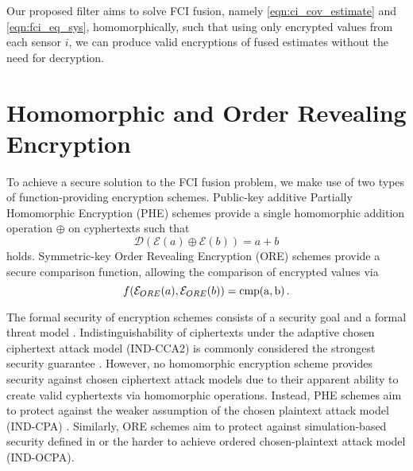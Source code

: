 \documentclass[letterpaper, 10 pt, conference]{ieeeconf}  %
\begin{document}
Our proposed filter aims to solve FCI fusion, namely \eqref{eqn:ci_cov_estimate} and \eqref{eqn:fci_eq_sys}, homomorphically, such that using only encrypted values from each sensor $i$, we can produce valid encryptions of fused estimates without the need for decryption.




\section{Homomorphic and Order Revealing Encryption} \label{sec:encryption}
To achieve a secure solution to the FCI fusion problem, we make use of two types of function-providing encryption schemes. Public-key additive Partially Homomorphic Encryption (PHE) schemes \cite{paillierPublicKeyCryptosystemsBased1999,goldwasserProbabilisticEncryption1984} provide a single homomorphic addition operation $\oplus$ on cyphertexts such that
\begin{equation}
   \mathcal{D}(\mathcal{E}(a) \oplus \mathcal{E}(b)) = a+b \label{eqn:phe_eq}
\end{equation}
holds. Symmetric-key Order Revealing Encryption (ORE) schemes \cite{chenettePracticalOrderRevealingEncryption2016,lewiOrderRevealingEncryptionNew2016} provide a secure comparison function, allowing the comparison of encrypted values via
\begin{equation}
   f(\mathcal{E}_{ORE}(a), \mathcal{E}_{ORE}(b)) = \operatorfont{cmp}(a, b)\,. \label{eqn:ore_eq}
\end{equation}

The formal security of encryption schemes consists of a security goal and a formal threat model \cite{katzIntroductionModernCryptography2008}. Indistinguishability of ciphertexts under the adaptive chosen ciphertext attack model (IND-CCA2) is commonly considered the strongest security guarantee \cite{bellareRelationsNotionsSecurity1998}. However, no homomorphic encryption scheme provides security against chosen ciphertext attack models due to their apparent ability to create valid cyphertexts via homomorphic operations. Instead, PHE schemes aim to protect against the weaker assumption of the chosen plaintext attack model (IND-CPA) \cite{chaseSecurityHomomorphicEncryption2017}. Similarly, ORE schemes aim to protect against simulation-based security defined in \cite{chenettePracticalOrderRevealingEncryption2016} or the harder to achieve ordered chosen-plaintext attack model (IND-OCPA).
\end{document}
